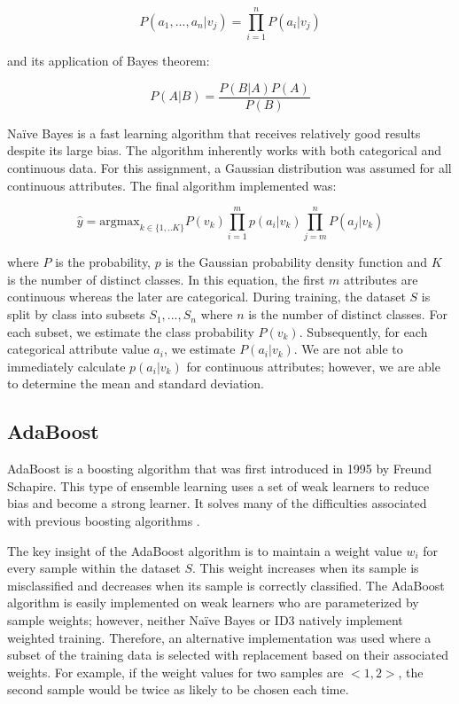 \documentclass[11pt,titlepage]{article}
\begin{document}
$$P(a_1,...,a_n|v_j) = \prod_{i=1}^{n}P(a_i|v_j)$$

and its application of Bayes theorem:

$$P(A|B) = \frac{P(B|A)P(A)}{P(B)}$$

Naïve Bayes is a fast learning algorithm that receives relatively good results despite its large bias. The algorithm inherently works with both categorical and continuous data. For this assignment, a Gaussian distribution was assumed for all continuous attributes. The final algorithm implemented was:

$$\hat{y}= \mathrm{argmax}_{k\in\{1,..K\}} P(v_k)\prod_{i=1}^mp\left(a_i|v_k\right)\prod_{j=m}^nP\left(a_j|v_k\right)$$

where $P$ is the probability, $p$ is the Gaussian probability density function and $K$ is the number of distinct classes. In this equation, the first $m$ attributes are continuous whereas the later are categorical. During training, the dataset $S$ is split by class into subsets ${S_1,...,S_n}$ where $n$ is the number of distinct classes. For each subset, we estimate the class probability $P(v_k)$. Subsequently, for each categorical attribute value $a_i$, we estimate $P(a_i|v_k)$. We are not able to immediately calculate $p(a_i|v_k)$ for continuous attributes; however, we are able to determine the mean and standard deviation.

\subsection{AdaBoost} \label{adaboost}
AdaBoost is a boosting algorithm that was first introduced in 1995 by Freund Schapire. This type of ensemble learning uses a set of weak learners to reduce bias and become a strong learner. It solves many of the difficulties associated with previous boosting algorithms \cite{Schapire:1999:BIB:1624312.1624417}.

The key insight of the AdaBoost algorithm is to maintain a weight value $w_i$ for every sample within the dataset $S$. This weight increases when its sample is misclassified and decreases when its sample is correctly classified. The AdaBoost algorithm is easily implemented on weak learners who are parameterized by sample weights; however, neither Naïve Bayes or ID3 natively implement weighted training. Therefore, an alternative implementation was used where a subset of the training data is selected with replacement based on their associated weights. For example, if the weight values for two samples are $<1, 2>$, the second sample would be twice as likely to be chosen each time.
\end{document}
